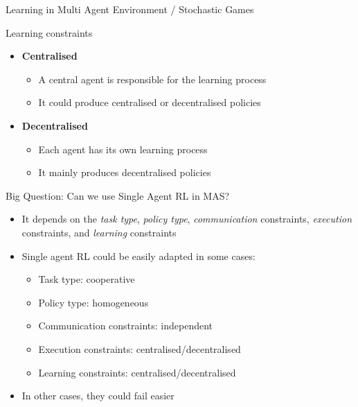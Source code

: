 \documentclass[presentation, 8pt]{beamer}\mode<presentation>{\usetheme{AMSBolognaFC}}
\begin{document}
\begin{frame}[allowframebreaks]{Learning in Multi Agent Environment / Stochastic Games}
\begin{exampleblock}{Learning constraints}
\begin{itemize}
	\item \textbf{Centralised}
	\begin{itemize}
		\item A central agent is responsible for the learning process
		\item It could produce centralised or decentralised policies
	\end{itemize}
	\item \textbf{Decentralised}
	\begin{itemize}
		\item Each agent has its own learning process
		\item It mainly produces decentralised policies
	\end{itemize}
\end{itemize}
\end{exampleblock}

\begin{alertblock}{Big Question: Can we use Single Agent RL in MAS?}
\begin{itemize}
	\item It depends on the \emph{task type}, \emph{policy type}, \emph{communication} constraints, \emph{execution} constraints, and \emph{learning} constraints
	\item Single agent RL could be easily adapted in some cases:
	\begin{itemize}
		\item Task type: cooperative
		\item Policy type: homogeneous
		\item Communication constraints: independent
		\item Execution constraints: centralised/decentralised
		\item Learning constraints: centralised/decentralised
	\end{itemize}
	\item In other cases, they could fail easier
\end{itemize}
\end{alertblock}
\end{frame}
\end{document}
